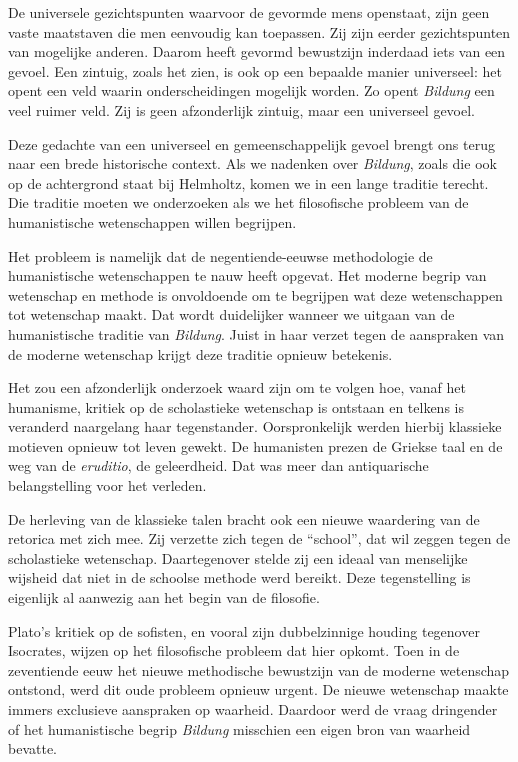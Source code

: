 De universele gezichtspunten waarvoor de gevormde mens openstaat, zijn geen vaste maatstaven die men eenvoudig kan toepassen. Zij zijn eerder gezichtspunten van mogelijke anderen. Daarom heeft gevormd bewustzijn inderdaad iets van een gevoel. Een zintuig, zoals het zien, is ook op een bepaalde manier universeel: het opent een veld waarin onderscheidingen mogelijk worden. Zo opent \textit{Bildung} een veel ruimer veld. Zij is geen afzonderlijk zintuig, maar een universeel gevoel.

Deze gedachte van een universeel en gemeenschappelijk gevoel brengt ons terug naar een brede historische context. Als we nadenken over \textit{Bildung}, zoals die ook op de achtergrond staat bij Helmholtz, komen we in een lange traditie terecht. Die traditie moeten we onderzoeken als we het filosofische probleem van de humanistische wetenschappen willen begrijpen.

Het probleem is namelijk dat de negentiende-eeuwse methodologie de humanistische wetenschappen te nauw heeft opgevat. Het moderne begrip van wetenschap en methode is onvoldoende om te begrijpen wat deze wetenschappen tot wetenschap maakt. Dat wordt duidelijker wanneer we uitgaan van de humanistische traditie van \textit{Bildung}. Juist in haar verzet tegen de aanspraken van de moderne wetenschap krijgt deze traditie opnieuw betekenis.

Het zou een afzonderlijk onderzoek waard zijn om te volgen hoe, vanaf het humanisme, kritiek op de scholastieke wetenschap is ontstaan en telkens is veranderd naargelang haar tegenstander. Oorspronkelijk werden hierbij klassieke motieven opnieuw tot leven gewekt. De humanisten prezen de Griekse taal en de weg van de \textit{eruditio}, de geleerdheid. Dat was meer dan antiquarische belangstelling voor het verleden.

De herleving van de klassieke talen bracht ook een nieuwe waardering van de retorica met zich mee. Zij verzette zich tegen de ``school'', dat wil zeggen tegen de scholastieke wetenschap. Daartegenover stelde zij een ideaal van menselijke wijsheid dat niet in de schoolse methode werd bereikt. Deze tegenstelling is eigenlijk al aanwezig aan het begin van de filosofie.

Plato's kritiek op de sofisten, en vooral zijn dubbelzinnige houding tegenover Isocrates, wijzen op het filosofische probleem dat hier opkomt. Toen in de zeventiende eeuw het nieuwe methodische bewustzijn van de moderne wetenschap ontstond, werd dit oude probleem opnieuw urgent. De nieuwe wetenschap maakte immers exclusieve aanspraken op waarheid. Daardoor werd de vraag dringender of het humanistische begrip \textit{Bildung} misschien een eigen bron van waarheid bevatte.

